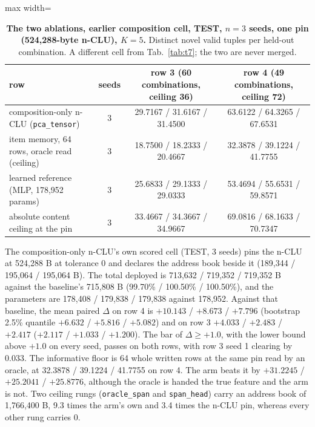 \documentclass{article} %
\begin{document}
\begin{table}[h]
\centering\small
\caption{\textbf{The two ablations, earlier composition cell, TEST, $n=3$ seeds, one pin
(524,288-byte n-CLU), $K=5$.} Distinct novel valid tuples per held-out combination. A different cell from %
Tab.~\ref{tab:t7}; the two are never merged.}
\label{tab:ablations}
\setlength{\tabcolsep}{3pt}
\begin{adjustbox}{max width=\linewidth}\begin{tabular}{lccc}
\toprule
row & seeds & row 3 (60 combinations, ceiling 36) & row 4 (49 combinations, ceiling 72) \\ %
\midrule
composition-only n-CLU (\texttt{pca\_tensor}) & 3 & 29.7167 / 31.6167 / 31.4500 & 63.6122 / 64.3265 / 67.6531 \\
item memory, 64 rows, oracle read (ceiling) & 3 & 18.7500 / 18.2333 / 20.4667 & 32.3878 / 39.1224 / 41.7755 \\
learned reference (MLP, 178,952 params) & 3 & 25.6833 / 29.1333 / 29.0333 & 53.4694 / 55.6531 / 59.8571 \\
absolute content ceiling at the pin & 3 & 33.4667 / 34.3667 / 34.9667 & 69.0816 / 68.1633 / 70.7347 \\
\bottomrule
\end{tabular}\end{adjustbox}
\end{table}



The composition-only n-CLU's own scored cell (TEST, 3 seeds) pins the n-CLU at 524,288 B at
tolerance 0 and declares the address book beside it (189,344 / 195,064 / 195,064 B). The total
deployed is 713,632 / 719,352 / 719,352 B against the baseline's 715,808 B (99.70\% / 100.50\% /
100.50\%), and the parameters are 178,408 / 179,838 / 179,838 against 178,952. %
Against that baseline, the mean paired $\Delta$ on row 4 is $+10.143$ / $+8.673$ / $+7.796$ (bootstrap
2.5\% quantile $+6.632$ / $+5.816$ / $+5.082$) and on row 3 $+4.033$ / $+2.483$ / $+2.417$
($+2.117$ / $+1.033$ / $+1.200$). The bar of $\Delta\ge+1.0$, with the lower bound above $+1.0$ on
every seed, passes on both rows, with row 3 seed 1 clearing by 0.033.
The informative floor is 64 whole written rows at the same pin read by an oracle, at 32.3878 /
39.1224 / 41.7755 on row 4. The arm beats it by $+31.2245$ / $+25.2041$ / $+25.8776$, although the
oracle is handed the true feature and the arm is not. %
Two ceiling rungs (\texttt{oracle\_span} and \texttt{span\_head}) carry an address book of 1,766,400
B, 9.3 times the arm's own and 3.4 times the n-CLU pin, whereas every other rung carries 0.
\end{document}
